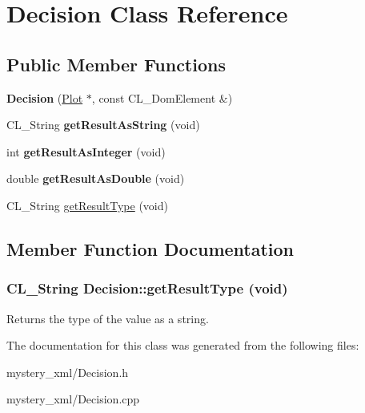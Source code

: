 \hypertarget{classDecision}{
\section{Decision Class Reference}
\label{classDecision}
}
\subsection*{Public Member Functions}
\begin{DoxyCompactItemize}
\item 
\hypertarget{classDecision_a7b8d8d0b3afb1ac36398d062118f6d6b}{
{\bfseries Decision} (\hyperlink{classPlot}{Plot} $\ast$, const CL\_\-DomElement \&)}
\label{classDecision_a7b8d8d0b3afb1ac36398d062118f6d6b}

\item 
\hypertarget{classDecision_ae6d6d18b9890c8706bd5986978be69b6}{
CL\_\-String {\bfseries getResultAsString} (void)}
\label{classDecision_ae6d6d18b9890c8706bd5986978be69b6}

\item 
\hypertarget{classDecision_a76817bb860641012831b8d5d7857562a}{
int {\bfseries getResultAsInteger} (void)}
\label{classDecision_a76817bb860641012831b8d5d7857562a}

\item 
\hypertarget{classDecision_a8ad5b405e0f154ffe064cb4f548b7931}{
double {\bfseries getResultAsDouble} (void)}
\label{classDecision_a8ad5b405e0f154ffe064cb4f548b7931}

\item 
CL\_\-String \hyperlink{classDecision_a3b4bc70a203e47be88bfdb6d5e059ffb}{getResultType} (void)
\end{DoxyCompactItemize}


\subsection{Member Function Documentation}
\hypertarget{classDecision_a3b4bc70a203e47be88bfdb6d5e059ffb}{
\subsubsection[{getResultType}]{\setlength{\rightskip}{0pt plus 5cm}CL\_\-String Decision::getResultType (void)}}
\label{classDecision_a3b4bc70a203e47be88bfdb6d5e059ffb}
Returns the type of the value as a string. 

The documentation for this class was generated from the following files:\begin{DoxyCompactItemize}
\item 
mystery\_\-xml/Decision.h\item 
mystery\_\-xml/Decision.cpp\end{DoxyCompactItemize}
